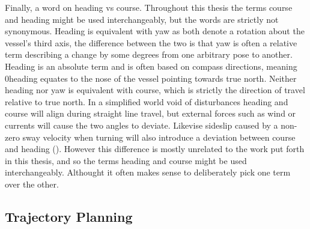 Finally, a word on heading vs course. Throughout this thesis the terms course and heading might be used interchangeably, but the words are strictly not synonymous.
Heading is equivalent with yaw as both denote a rotation about the vessel's third axis, the difference between the two is that yaw is often a relative term describing
a change by some degrees from one arbitrary pose to another. Heading is an absolute term and is often based on compass directions, meaning 0\textdegree heading
equates to the nose of the vessel pointing towards true north. Neither heading nor yaw is equivalent with course, which is strictly the direction
of travel relative to true north. In a simplified world void of disturbances heading and course will align during straight line
travel, but external forces such as wind or currents will cause the two angles to deviate. Likevise sideslip caused by a non-zero sway velocity when turning will 
also introduce a deviation between course and heading (\cite{fossen2011handbook}). However this difference is mostly unrelated to the work put forth in this thesis, 
and so the terms heading and course might be used interchangeably. Althought it often makes sense to deliberately pick one
term over the other.


\subsection{Trajectory Planning}

